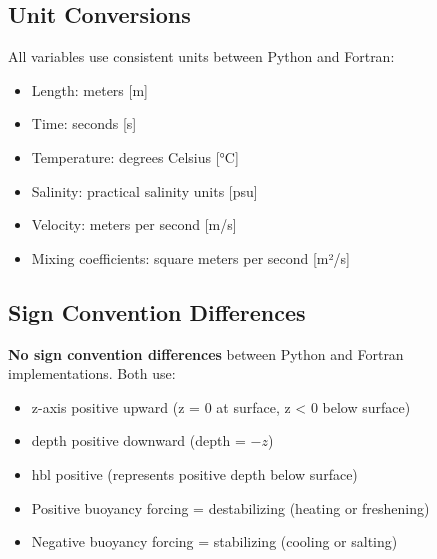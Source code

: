 \documentclass[11pt]{article}
\begin{document}
\subsection{Unit Conversions}

All variables use consistent units between Python and Fortran:
\begin{itemize}
    \item Length: meters [m]
    \item Time: seconds [s]
    \item Temperature: degrees Celsius [°C]
    \item Salinity: practical salinity units [psu]
    \item Velocity: meters per second [m/s]
    \item Mixing coefficients: square meters per second [m²/s]
\end{itemize}

\subsection{Sign Convention Differences}

\textbf{No sign convention differences} between Python and Fortran implementations. Both use:
\begin{itemize}
    \item z-axis positive upward (z = 0 at surface, z < 0 below surface)
    \item depth positive downward (depth = $-z$)
    \item hbl positive (represents positive depth below surface)
    \item Positive buoyancy forcing = destabilizing (heating or freshening)
    \item Negative buoyancy forcing = stabilizing (cooling or salting)
\end{itemize}
\end{document}
